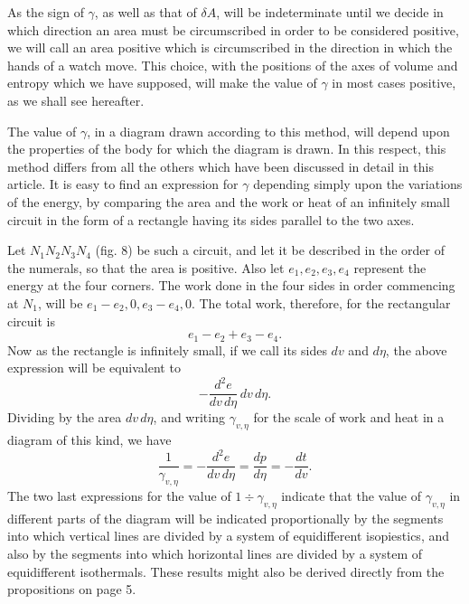 \documentclass[11pt]{article}
\begin{document}
As the sign of $\gamma$, as well as that of $\delta A$, will be indeterminate until we decide in which direction an area must be circumscribed in order to be considered positive, we will call an area positive which is circumscribed in the direction in which the hands of a watch move. This choice, with the positions of the axes of volume and entropy which we have supposed, will make the value of $\gamma$ in most cases positive, as we shall see hereafter.

The value of $\gamma$, in a diagram drawn according to this method, will depend upon the properties of the body for which the diagram is drawn. In this respect, this method differs from all the others which have been discussed in detail in this article. It is easy to find an expression for $\gamma$ depending simply upon the variations of the energy, by comparing the area and the work or heat of an infinitely small circuit in the form of a rectangle having its sides parallel to the two axes.

\begin{figure}[h]
\centering
{}
\end{figure}

Let $N_1N_2N_3N_4$ (fig. 8) be such a circuit, and let it be described in the order of the numerals, so that the area is positive. Also let $e_1,e_2,e_3,e_4$ represent the energy at the four corners. The work done in the four sides in order commencing at $N_1$, will be $e_1-e_2,0,e_3-e_4,0$. The total work, therefore, for the rectangular circuit is
\[
e_1-e_2+e_3-e_4.
\]
Now as the rectangle is infinitely small, if we call its sides $dv$ and $d\eta$, the above expression will be equivalent to
\[
-\frac{d^2e}{dv\,d\eta}\,dv\,d\eta.
\]
Dividing by the area $dv\,d\eta$, and writing $\gamma_{v,\eta}$ for the scale of work and heat in a diagram of this kind, we have
\[
\frac{1}{\gamma_{v,\eta}}
=-\frac{d^2e}{dv\,d\eta}=\frac{dp}{d\eta}=-\frac{dt}{dv}. \tag{15}
\]
The two last expressions for the value of $1\div\gamma_{v,\eta}$ indicate that the value of $\gamma_{v,\eta}$ in different parts of the diagram will be indicated proportionally by the segments into which vertical lines are divided by a system of equidifferent isopiestics, and also by the segments into which horizontal lines are divided by a system of equidifferent isothermals. These results might also be derived directly from the propositions on page 5.
\end{document}

